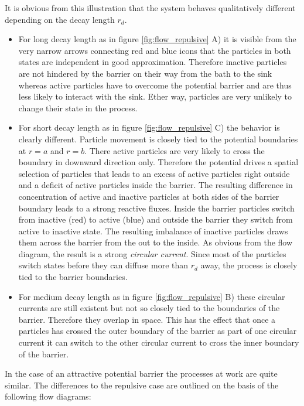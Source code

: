 It is obvious from this illustration that the system behaves qualitatively different depending on the decay length $r_d$.
\begin{itemize}
    \item For long decay length as in figure \ref{fig:flow_repulsive} A) it is visible from the very narrow arrows connecting red and blue icons that the particles in both states are independent in good approximation. Therefore inactive particles are not hindered by the barrier on their way from the bath to the sink whereas active particles have to overcome the potential barrier and are thus less likely to interact with the sink. Ether way, particles are very unlikely to change their state in the process. 
    \item For short decay length as in figure \ref{fig:flow_repulsive} C) the behavior is clearly different. Particle movement is closely tied to the potential boundaries at $r=a$ and $r=b$. There active particles are very likely to cross the boundary in downward direction only. Therefore the potential drives a spatial selection of particles that leads to an excess of active particles right outside and a deficit of active particles inside the barrier. The resulting difference in concentration of active and inactive particles at both sides of the barrier boundary leads to a strong reactive fluxes. Inside the barrier particles switch from inactive (red) to active (blue) and outside the barrier they switch from active to inactive state. The resulting imbalance of inactive particles draws them across the barrier from the out to the inside. As obvious from the flow diagram, the result is a strong \emph{circular current}. Since most of the particles switch states before they can diffuse more than $r_d$ away, the 
process is closely tied to the barrier boundaries. 
    \item For medium decay length as in figure \ref{fig:flow_repulsive} B) these circular currents are still existent but not so closely tied to the boundaries of the barrier. Therefore they overlap in space. This has the effect that once a particles has crossed the outer boundary of the barrier as part of one circular current it can switch to the other circular current to cross the inner boundary of the barrier. 
\end{itemize}
In the case of an attractive potential barrier the processes at work are quite similar. The differences to the repulsive case are outlined on the basis of the following flow diagrams: \vspace{-.5 cm} \\
